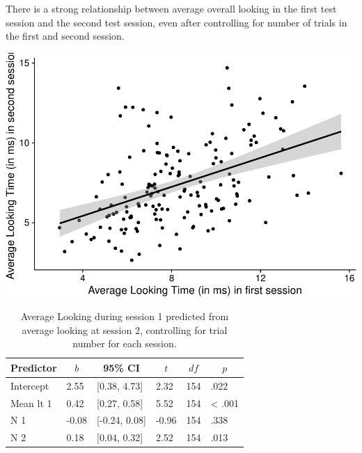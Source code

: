 \documentclass[
  man, donotrepeattitle,floatsintext]{apa6}
\begin{document}
There is a strong relationship between average overall looking in the first test session and the second test session, even after controlling for number of trials in the first and second session.

\includegraphics{MB1T_supplement_files/figure-latex/unnamed-chunk-9-1.pdf}

\begin{table}[tbp]

\begin{center}
\begin{threeparttable}

\caption{\label{tab:unnamed-chunk-9}Average Looking during session 1 predicted from average looking at session 2, controlling for trial number for each session.}

\begin{tabular}{llllll}
\toprule
Predictor & \multicolumn{1}{c}{$b$} & \multicolumn{1}{c}{95\% CI} & \multicolumn{1}{c}{$t$} & \multicolumn{1}{c}{$\mathit{df}$} & \multicolumn{1}{c}{$p$}\\
\midrule
Intercept & 2.55 & {}[0.38, 4.73] & 2.32 & 154 & .022\\
Mean lt 1 & 0.42 & {}[0.27, 0.58] & 5.52 & 154 & < .001\\
N 1 & -0.08 & {}[-0.24, 0.08] & -0.96 & 154 & .338\\
N 2 & 0.18 & {}[0.04, 0.32] & 2.52 & 154 & .013\\
\bottomrule
\end{tabular}

\end{threeparttable}
\end{center}

\end{table}
\end{document}
